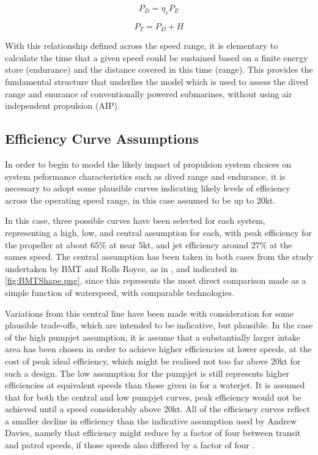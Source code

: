 \documentclass{article}\usepackage[]{graphicx}\usepackage[]{color}
\begin{document}
\begin{equation}
\label{eq:powerdrawn}
P_D = \eta_vP_E
\end{equation}

\begin{equation}
\label{eq:totalpower}
P_T = P_D + H
\end{equation}

With this relationship defined across the speed range, it is elementary to calculate the time that a given speed could be sustained based on a finite energy store (endurance) and the distance covered in this time (range).  This provides the fundamental structure that underlies the model which is used to assess the dived range and enurance of conventionally powered submarines, without using air independent propulsion (AIP).

\subsection{Efficiency Curve Assumptions}

In order to begin to model the likely impact of propulsion system choices on system peformance characteristics such as dived range and endurance, it is necessary to adopt some plausible curves indicating likely levels of efficiency across the operating speed range, in this case assumed to be up to 20kt.

In this case, three possible curves have been selected for each system, representing a high, low, and central assumption for each, with peak efficiency for the propeller at about 65\% at near 5kt, and jet efficiency around 27\% at the sames speed.  The central assumption has been taken in both cases from the study undertaken by BMT and Rolls Royce, as in \cite{giles2010}, and indicated in \ref{fig:BMTShape.png}, since this represents the most direct comparison made as a simple function of waterspeed, with comparable technologies.

Variations from this central line have been made with consideration for some plausible trade-offs, which are intended to be indicative, but plausible.  In the case of the high pumpjet assumption, it is assume that a substantially larger intake area has been chosen in order to achieve higher efficiencies at lower speeds, at the cost of peak ideal efficiency, which might be realised not too far above 20kt for such a design.  The low assumption for the pumpjet is still represents higher efficiencies at equivalent speeds than those given in \cite{fujisawa1995} for a waterjet. It is assumed that for both the central and low pumpjet curves, peak efficiency would not be achieved until a speed considerably above 20kt.  All of the efficiency curves reflect a smaller decline in efficiency than the indicative assumption used by Andrew Davies, namely that efficiency might reduce by a factor of four between transit and patrol speeds, if those speeds also differed by a factor of four \cite{davies2017}.
\end{document}
